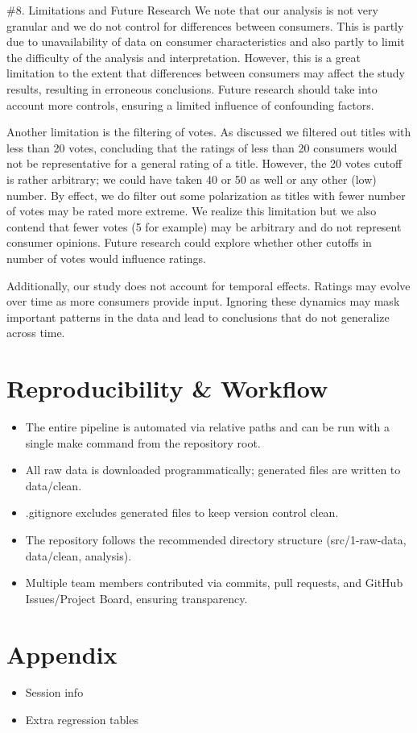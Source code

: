 \documentclass[
  11pt,
]{article}
\begin{document}
\#8. Limitations and Future Research We note that our analysis is not
very granular and we do not control for differences between consumers.
This is partly due to unavailability of data on consumer characteristics
and also partly to limit the difficulty of the analysis and
interpretation. However, this is a great limitation to the extent that
differences between consumers may affect the study results, resulting in
erroneous conclusions. Future research should take into account more
controls, ensuring a limited influence of confounding factors.

Another limitation is the filtering of votes. As discussed we filtered
out titles with less than 20 votes, concluding that the ratings of less
than 20 consumers would not be representative for a general rating of a
title. However, the 20 votes cutoff is rather arbitrary; we could have
taken 40 or 50 as well or any other (low) number. By effect, we do
filter out some polarization as titles with fewer number of votes may be
rated more extreme. We realize this limitation but we also contend that
fewer votes (5 for example) may be arbitrary and do not represent
consumer opinions. Future research could explore whether other cutoffs
in number of votes would influence ratings.

Additionally, our study does not account for temporal effects. Ratings
may evolve over time as more consumers provide input. Ignoring these
dynamics may mask important patterns in the data and lead to conclusions
that do not generalize across time.

\section{Reproducibility \& Workflow}\label{reproducibility-workflow}

\begin{itemize}
\item
  The entire pipeline is automated via relative paths and can be run
  with a single make command from the repository root.
\item
  All raw data is downloaded programmatically; generated files are
  written to data/clean.
\item
  .gitignore excludes generated files to keep version control clean.
\item
  The repository follows the recommended directory structure
  (src/1-raw-data, data/clean, analysis).
\item
  Multiple team members contributed via commits, pull requests, and
  GitHub Issues/Project Board, ensuring transparency.
\end{itemize}

\section{Appendix}\label{appendix}

\begin{itemize}
\item
  Session info
\item
  Extra regression tables
\end{itemize}
\end{document}
